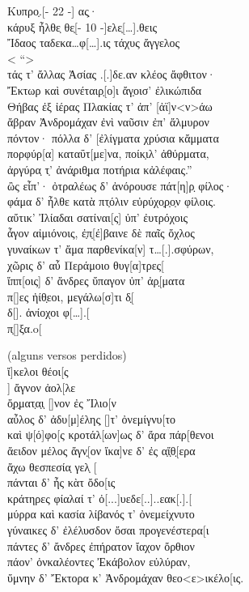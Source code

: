 \begin{gkverse}
Κυπρο̣.[\qquad     - 22 -\qquad       ] ας̣·\\
κάρυξ ἦλθε̣ θε̣[\qquad - 10 -\qquad  ]ελε̣[\ldots{}].θεις\\
Ἴδαος ταδεκα\ldots{}φ[\ldots{}].ις τάχυς ἄγγελος\\
< “\qquad			>\\
τάς τ’ ἄλλας Ἀσίας .[.]δε.αν κλέος ἄφθιτον·\\
Ἔκτωρ καὶ συνέταιρ̣[ο]ι ἄγ̣οισ’ ἐλικώπιδα\\
Θήβας ἐξ ἰέρας Πλακίας τ’ ἀπ’ [ἀϊ]ν<ν>άω\\
ἄβραν Ἀνδρομάχαν ἐνὶ ναῦσιν ἐπ’ ἄλμυρον\\
πόντον· πόλλα δ’ [ἐλίγματα χρύσια κἄμματα\\
πορφύρ[α] καταΰτ[με]να, ποίκ̣ιλ’ ἀθύρματα,\\
ἀργύρα̣ τ̣’ ἀνά̣ριθ̣μα ποτήρια κἀλέφαις.”\\
ὢς εἶπ’· ὀτραλέως δ’ ἀνόρουσε πάτ[η]ρ̣ φίλος·\\
φάμα δ’ ἦλθε κατὰ πτ̣όλιν εὐρύχο̣ρ̣ο̣ν φίλοις.\\
αὔτικ’ Ἰλίαδαι σατίναι[ς] ὐπ’ ἐυτρόχοις\\
ἆγον αἰμιόνοις, ἐ̣π̣[έ]βαινε δὲ παῖς ὄχλος\\
γυναίκων τ’ ἄμα παρθενίκα[ν] τ\ldots{}[.].σφύρων,\\
χῶρις δ’ αὖ Περάμοιο θυγ[α]τρες[\\
ἴππ[οις] δ’ ἄνδρες ὔπαγον ὐπ’ ἀρ̣[ματα\\
π[\qquad  ]ες ἠίθ̣εοι, μεγάλω[σ]τι δ̣[\\
δ[\qquad  ]. ἀνίοχοι φ[\ldots{}].[\\
π̣[\qquad  ]ξα.o[

\textnormal{(alguns versos perdidos)}\\
\vinphantom{ὄ̣ρ̣ματ̣α̣ι̣ [\qquad\qquad\quad}    ἴ]κελοι θέοι[ς\\
\vinphantom{ὄ̣ρ̣ματ̣α̣ι̣ [\qquad\qquad\quad}     ] ἄγνον ἀολ[λε\\
ὄ̣ρ̣ματ̣α̣ι̣ [\qquad\qquad\quad			     ]νον ἐς Ἴλιο[ν\\
αὖλος δ’ ἀδυ[μ]έλης̣ [\qquad	    ]τ’ ὀνεμίγνυ[το\\
καὶ ψ[ό]φο[ς κροτάλ[ων\qquad    ]ως δ’ ἄρα πάρ[θενοι\\
ἄειδον μέλος ἄγν̣[ον ἴκα]νε δ’ ἐς α̣ἴ̣θ̣[ερα\\
ἄχω θεσπεσία̣ γελ̣ [\\
πάνται δ’ ἦς κὰτ ὄδο[ις\\
κράτηρες φίαλαί τ’ ὀ[...]υεδε[..]..εακ[.].[\\
μύρρα καὶ κασία λίβανός τ’ ὀνεμείχνυτο\\
γύναικες δ’ ἐλέλυσδον ὄσαι προγενέστερα[ι\\
πάντες δ’ ἄνδρες ἐπήρατον ἴαχον ὄρθιον\\
πάον’ ὀνκαλέοντες Ἐκάβολον εὐλύραν,\\
ὔμνην δ’ Ἔκτορα κ’ Ἀνδρομάχαν θεο<ε>ικέλο[ις.	
\end{gkverse}

